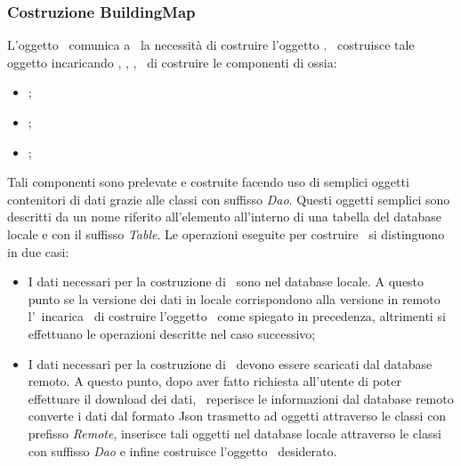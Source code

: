 \documentclass[../Funzionalita.tex]{subfiles}
\begin{document}
			
		\subsubsection{Costruzione BuildingMap}
			L'oggetto \InformationManagerImp\ comunica a \DatabaseService\ la necessità di costruire l'oggetto \BuildingMap. \DatabaseService\ costruisce tale oggetto incaricando \PointOfInterestService, \RegionOfInterestService, \EdgeService, \PhotoService\ di costruire le componenti di \BuildingMap ossia:
			\begin{itemize}
				\item \PointOfInterest;
				\item \RegionOfInterest;
				\item \EnrichedEdge;
			\end{itemize}
			Tali componenti sono prelevate e costruite facendo uso di semplici oggetti contenitori di dati grazie alle classi con suffisso \textit{Dao}. Questi oggetti semplici sono descritti da un nome riferito all'elemento all'interno di una tabella del database locale e con il suffisso \textit{Table}. 
			Le operazioni eseguite per costruire \BuildingMap\ si distinguono in due casi:
			\begin{itemize}
				\item I dati necessari per la costruzione di \BuildingMap\ sono nel database locale. A questo punto se la versione dei dati in locale corrispondono alla versione in remoto l'\InformationManagerImp\ incarica \DatabaseService\ di costruire l'oggetto \BuildingMap\ come spiegato in precedenza, altrimenti si effettuano le operazioni descritte nel caso successivo;
				\item I dati necessari per la costruzione di \BuildingMap\ devono essere scaricati dal database remoto. A questo punto, dopo aver fatto richiesta all'utente di poter effettuare il download dei dati, \DatabaseService\ reperisce le informazioni dal database remoto converte i dati dal formato Json trasmetto ad oggetti attraverso le classi con prefisso \textit{Remote}, inserisce tali oggetti nel database locale attraverso le classi con suffisso \textit{Dao} e infine costruisce l'oggetto \BuildingMap\ desiderato.
			\end{itemize}
			
		
\end{document}
